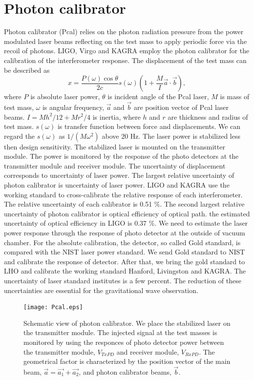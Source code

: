 \documentclass[]{spie}  %
\begin{document}
\section{Photon calibrator} \label{sec:Pcal}
Photon calibrator (Pcal) relies on the photon radiation pressure from the power modulated laser beams reflecting on the test mass to apply periodic force via the recoil of photons. 
LIGO, Virgo and KAGRA employ the photon calibrator for the calibration of the interferometer response. The displacement of the test mass can be described as
\begin{equation}
 x = \frac{P(\omega) \cos{\theta}}{2c} s(\omega)\left(1+\frac{M}{I}\vec{a} \cdot \vec{b} \right) , \label{pcal}
\end{equation}
where $P$ is absolute laser power, $\theta$ is incident angle of the Pcal laser, $M$ is mass of test mass, $\omega$ is angular frequency, $\vec{a}$ and $\vec{b}$ are position vector of Pcal laser beams. $I=Mh^2/12+Mr^2/4$ is inertia, where $h$ and  $r$ are thickness and radius of test mass. $s(\omega)$ is transfer function between force and displacements. We can regard the $s(\omega)$ as $1/(M \omega^2)$ above 20 Hz. The laser power is stabilized less then design sensitivity. The stabilized laser is mounted on the transmitter module. The power is monitored by the response of the photo detectors at the transmitter module and receiver module.  The uncertainty of displacement corresponds to uncertainty of laser power. 
The largest relative uncertainty of photon calibrator is uncertainty of laser power.
LIGO and KAGRA use the working standard to cross-calibrate the relative response of each interferometer. The relative uncertainty of  each  calibrator is 0.51 \%. 
The second largest relative uncertainty of photon calibrator is optical efficiency of optical path. the estimated uncertainty of optical efficiency in LIGO is 0.37 \%. We need to estimate the laser power response through the response of photo detector at the outside of vacuum chamber. 
For the absolute calibration, the detector, so called Gold standard, is compared with the NIST laser power standard. We send Gold standard to NIST and calibrate the response of detector. After that, we bring the gold standard to LHO and calibrate the working standard Hanford, Livingston and KAGRA. The uncertainty of laser standard institutes is a few percent. 
The reduction of these uncertainties are essential for the gravitational wave observation.

\begin{figure}
\begin{center}
\texttt{[image: Pcal.eps]}
\caption{Schematic view of photon calibrator. We place the stabilized laser on the transmitter module. The injected signal at the test masses is monitored by using the responces of photo detector power between the transmitter module, $V_{TxPD}$ and  receiver module, $V_{RxPD}$.  The geometrical factor is characterized by the position vector of the main beam, $\vec{a}=\vec{a_1}+\vec{a_2}$, and photon calibrator beams, $\vec{b}$.}
\label{fig:Pcal}
\end{center}
\end{figure}
\end{document}
